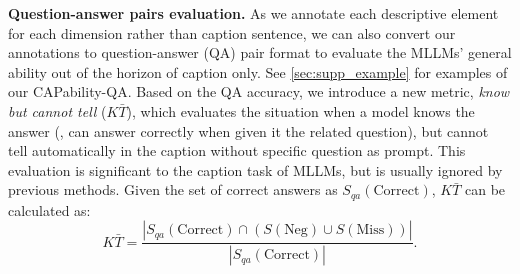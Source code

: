 \noindent\textbf{Question-answer pairs evaluation.}
As we annotate each descriptive element for each dimension rather than caption sentence, we can also convert our annotations to question-answer (QA) pair format to evaluate the MLLMs' general ability out of the horizon of caption only. See \cref{sec:supp_example} for examples of our CAPability-QA. Based on the QA accuracy, we introduce a new metric, \textit{know but cannot tell} ($K\bar{T}$), which evaluates the situation when a model knows the answer (\ie, can answer correctly when given it the related question), but cannot tell automatically in the caption without specific question as prompt. This evaluation is significant to the caption task of MLLMs, but is usually ignored by previous methods. Given the set of correct answers as $S_{qa}(\text{Correct})$, $K\bar{T}$ can be calculated as:
\begin{equation}
    K\bar{T} = \frac{\left|S_{qa}(\text{Correct}) \cap (S(\text{Neg}) \cup S(\text{Miss}))\right|}{|S_{qa}(\text{Correct})|}.
\end{equation}

